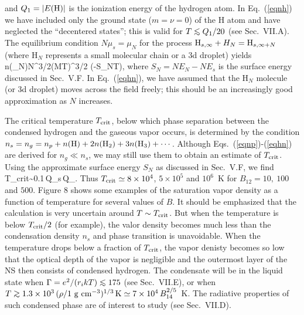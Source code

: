 and $Q_1=|E({\rm H})|$ is the ionization energy of the hydrogen atom.
In Eq.~(\ref{eqnh}) we have included only the ground state ($m=\nu=0$)
of the H atom and have neglected the ``decentered states''; this is valid
for $T\lo Q_1/20$ (see Sec.~VII.A). The equilibrium condition 
$N\mu_s=\mu_N$ for the process ${\rm H}_{s,\infty}+H_N={\rm H}_{s,\infty+N}$ 
(where H$_N$ represents a small molecular chain or a 3d droplet) yields
\be
n(\rH_N)\simeq N^{3/2}\left({MT\pi}\right)^{3/2}
\exp\left(-{S_N\over T}\right),
\label{eqhn}\ee
where $S_N=NE_N-NE_s$ is the surface energy discussed in Sec.~V.F.
In Eq.~(\ref{eqhn}), we have assumed that the H$_N$ molecule (or 3d droplet) 
moves across the field freely; this should be an increasingly good 
approximation as $N$ increases.

The critical temperature $T_{\rm crit}$, below which phase 
separation between the condensed hydrogen and the gaseous vapor occurs, is
determined by the condition $n_s=n_g=n_p+n({\rm H})+2n({\rm H}_2)+3n({\rm H}_3)+\cdots$. 
Although Eqs.~(\ref{eqnp})-(\ref{eqhn}) are derived for $n_g\ll n_s$,
we may still use them to obtain an estimate of $T_{\rm crit}$.
Using the approximate surface energy $S_N$ as discussed in Sec.~V.F,
we find
\be
T_{\rm crit}\sim 0.1\,Q_s\,Q_\infty.
\ee
Thus $T_{\rm crit}\simeq 8\times 10^4$, $5\times 10^5$ and $10^6$~K for
$B_{12}=10,~100$ and $500$. Figure 8 shows some examples of
the saturation vapor density as a function of temperature for several
values of $B$. It should be emphasized that the calculation is very uncertain
around $T\sim T_{\rm crit}$. But when the temperature is below
$T_{\rm crit}/2$ (for example), the valor density becomes much less than
the condensation density $n_s$ and phase transition is unavoidable.
When the temperature drops below a fraction of $T_{\rm crit}$,
the vapor denisty becomes so low that the optical depth of the vapor is
negligible and the outermost layer of the NS then consists of
condensed hydrogen. The condensate will be in the liquid state when
$\Gamma=e^2/(r_ikT)\lo 175$ (see Sec.~VII.E), or when
$T\go 1.3\times 10^3\,(\rho/1~{\rm g~cm}^{-3})^{1/3}\,{\rm K}
\simeq 7\times 10^4\,B_{14}^{2/5}$~K. The radiative properties of such
condensed phase are of interest to study (see Sec.~VII.D).
 


